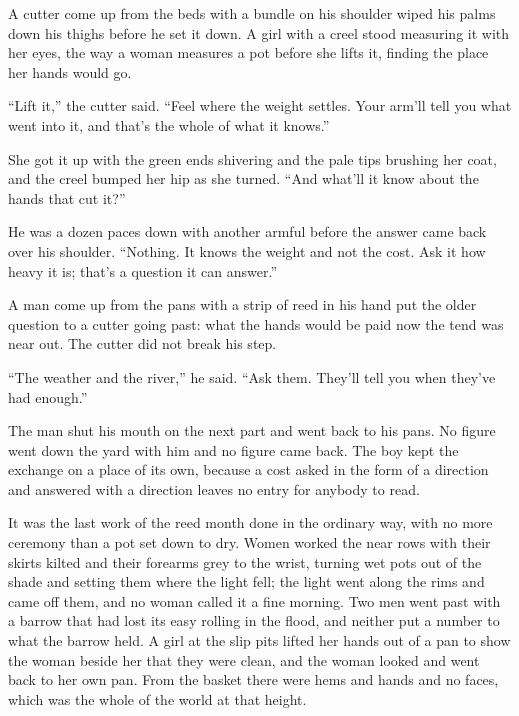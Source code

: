 A cutter come up from the beds with a bundle on his shoulder wiped his palms down his thighs before he set it down. A girl with a creel stood measuring it with her eyes, the way a woman measures a pot before she lifts it, finding the place her hands would go.

“Lift it,” the cutter said. “Feel where the weight settles. Your arm’ll tell you what went into it, and that’s the whole of what it knows.”

She got it up with the green ends shivering and the pale tips brushing her coat, and the creel bumped her hip as she turned. “And what’ll it know about the hands that cut it?”

He was a dozen paces down with another armful before the answer came back over his shoulder. “Nothing. It knows the weight and not the cost. Ask it how heavy it is; that's a question it can answer.”

A man come up from the pans with a strip of reed in his hand put the older question to a cutter going past: what the hands would be paid now the tend was near out. The cutter did not break his step.

“The weather and the river,” he said. “Ask them. They'll tell you when they've had enough.”

The man shut his mouth on the next part and went back to his pans. No figure went down the yard with him and no figure came back. The boy kept the exchange on a place of its own, because a cost asked in the form of a direction and answered with a direction leaves no entry for anybody to read.

It was the last work of the reed month done in the ordinary way, with no more ceremony than a pot set down to dry. Women worked the near rows with their skirts kilted and their forearms grey to the wrist, turning wet pots out of the shade and setting them where the light fell; the light went along the rims and came off them, and no woman called it a fine morning. Two men went past with a barrow that had lost its easy rolling in the flood, and neither put a number to what the barrow held. A girl at the slip pits lifted her hands out of a pan to show the woman beside her that they were clean, and the woman looked and went back to her own pan. From the basket there were hems and hands and no faces, which was the whole of the world at that height.

